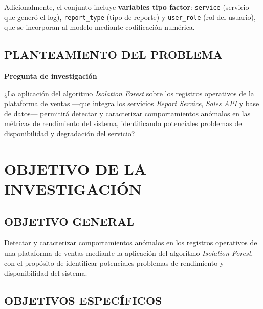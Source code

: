 \documentclass[12pt,letterpaper, oneside]{book}
\begin{document}
    Adicionalmente, el conjunto incluye \textbf{variables tipo factor}:
    \texttt{service} (servicio que generó el log), \texttt{report\_type}
    (tipo de reporte) y \texttt{user\_role} (rol del usuario), que
    se incorporan al modelo mediante codificación numérica.

    \section{PLANTEAMIENTO DEL PROBLEMA}

    \textbf{Pregunta de investigación}

    ¿La aplicación del algoritmo \textit{Isolation Forest} sobre los
    registros operativos de la plataforma de ventas —que integra los
    servicios \textit{Report Service}, \textit{Sales API} y base de
    datos— permitirá detectar y caracterizar comportamientos anómalos
    en las métricas de rendimiento del sistema, identificando
    potenciales problemas de disponibilidad y degradación del servicio?

    \chapter{OBJETIVO DE LA INVESTIGACIÓN}

    \section{OBJETIVO GENERAL}

    Detectar y caracterizar comportamientos anómalos en los registros
    operativos de una plataforma de ventas mediante la aplicación del
    algoritmo \textit{Isolation Forest}, con el propósito de identificar
    potenciales problemas de rendimiento y disponibilidad del sistema.

    \section{OBJETIVOS ESPECÍFICOS}
\end{document}

